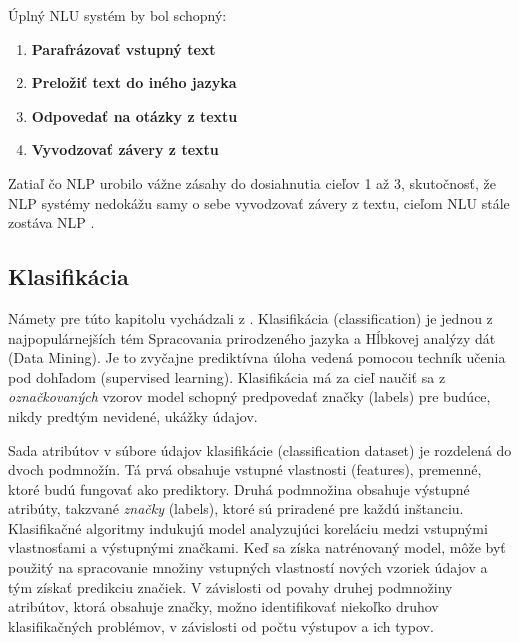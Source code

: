 Úplný NLU systém by bol schopný:

\begin{enumerate}
    \item \textbf{Parafrázovať vstupný text}
    \item \textbf{Preložiť text do iného jazyka}
    \item \textbf{Odpovedať na otázky z textu}
    \item \textbf{Vyvodzovať závery z textu}
\end{enumerate}

Zatiaľ čo NLP urobilo vážne zásahy do dosiahnutia cieľov 1 až 3, skutočnosť, že NLP systémy nedokážu samy o sebe vyvodzovať závery z textu, cieľom NLU stále zostáva NLP \cite{Liddy:2001} .

\subsection{Klasifikácia}

Námety pre túto kapitolu vychádzali z \cite{Herrera:2016}. Klasifikácia (classification) je jednou z najpopulárnejších tém Spracovania prirodzeného jazyka a Hĺbkovej analýzy dát (Data Mining). Je to zvyčajne prediktívna úloha vedená pomocou techník učenia pod dohľadom (supervised learning). Klasifikácia má za cieľ naučiť sa z \textit{označkovaných} vzorov model schopný predpovedať značky (labels) pre budúce, nikdy predtým nevidené, ukážky údajov.

Sada atribútov v súbore údajov klasifikácie (classification dataset) je rozdelená do dvoch podmnožín. Tá prvá obsahuje vstupné vlastnosti (features), premenné, ktoré budú fungovať ako prediktory. Druhá podmnožina obsahuje výstupné atribúty, takzvané \textit{značky} (labels), ktoré sú priradené pre každú inštanciu. Klasifikačné algoritmy indukujú model analyzujúci koreláciu medzi vstupnými vlastnosťami a výstupnými značkami. Keď sa získa natrénovaný model, môže byť použitý na spracovanie množiny vstupných vlastností nových vzoriek údajov a tým získať predikciu značiek. V závislosti od povahy druhej podmnožiny atribútov, ktorá obsahuje značky, možno identifikovať niekoľko druhov klasifikačných problémov, v závislosti od počtu výstupov a ich typov. 

